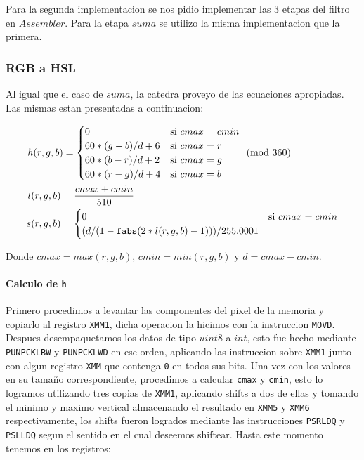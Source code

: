 Para la segunda implementacion se nos pidio implementar las 3 etapas del filtro en $Assembler$. Para la etapa $suma$ se utilizo la misma implementacion que la primera.

\subsubsection{RGB a HSL}

Al igual que el caso de $suma$, la catedra proveyo de las ecuaciones apropiadas. Las mismas estan presentadas a continuacion:

\begin{align*}
h(r, g, b) =
\begin{cases}
0 &\mbox{si}\ cmax = cmin\\
60* (g-b)/d + 6 &\mbox{si}\ cmax = r \\
60* (b-r)/d + 2 &\mbox{si}\ cmax = g \\
60* (r-g)/d + 4 &\mbox{si}\ cmax = b 
\end{cases}
\pmod{360}\hspace{17mm}
\\
l(r, g, b) = \frac{cmax + cmin}{510}\hspace{73mm}
\\
s(r, g, b) =
\begin{cases}
0 &\mbox{si}\ cmax = cmin \\
(d/(1-\texttt{fabs}(2*l(r, g, b) - 1)))/255.0001
\end{cases}
\end{align*}

Donde $cmax = max(r,g,b)$, $cmin = min(r,g,b)$ y $d = cmax - cmin$.

\paragraph{Calculo de \texttt{h}\newline}

Primero procedimos a levantar las componentes del pixel de la memoria y copiarlo al registro \texttt{XMM1}, dicha operacion la hicimos con la instruccion \texttt{MOVD}. Despues desempaquetamos los datos de tipo $uint8$ a $int$, esto fue hecho mediante \texttt{PUNPCKLBW} y \texttt{PUNPCKLWD} en ese orden, aplicando las instruccion sobre \texttt{XMM1} junto con algun registro \texttt{XMM} que contenga \texttt{0} en todos sus bits. Una vez con los valores en su tamaño correspondiente, procedimos a calcular \texttt{cmax} y \texttt{cmin}, esto lo logramos utilizando tres copias de \texttt{XMM1}, aplicando shifts a dos de ellas y tomando el minimo y maximo vertical almacenando el resultado en \texttt{XMM5} y \texttt{XMM6} respectivamente, los shifts fueron logrados mediante las instrucciones \texttt{PSRLDQ} y \texttt{PSLLDQ} segun el sentido en el cual deseemos shiftear. Hasta este momento tenemos en los registros:\\

